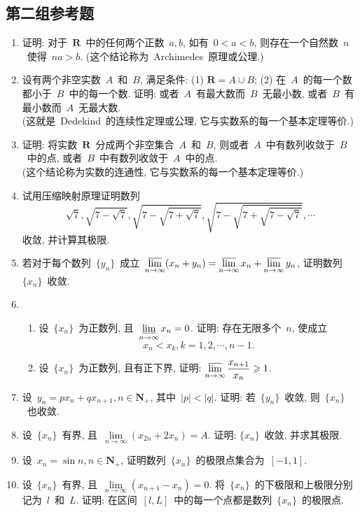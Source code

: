 \documentclass[UTF8,a4paper,11pt,twoside]{book}
\begin{document}
\subsection{第二组参考题}
\begin{enumerate}
	\item 证明: 对于~$\mathbf{R}$~中的任何两个正数~$a,b$, 如有~$0<a<b$, 则存在一个自然数~$n$~使得~$na>b$. (这个结论称为~Archimedes~原理或公理.)

	\item 设有两个非空实数~$A$~和~$B$, 满足条件: (1) $\mathbf{R}=A\cup B$; (2) 在~$A$~的每一个数都小于~$B$~中的每一个数. 证明: 或者~$A$~有最大数而~$B$~无最小数, 或者~$B$~有最小数而~$A$~无最大数.\\
	      (这就是~Dedekind~的连续性定理或公理, 它与实数系的每一个基本定理等价.)

	\item 证明: 将实数~$\mathbf{R}$~分成两个非空集合~$A$~和~$B$, 则或者~$A$~中有数列收敛于~$B$~中的点, 或者~$B$~中有数列收敛于~$A$~中的点.\\
	      (这个结论称为实数的连通性, 它与实数系的每一个基本定理等价.)

	\item 试用压缩映射原理证明数列
	      \[
		      \sqrt{7}, \sqrt{7-\sqrt{7}}, \sqrt{7-\sqrt{7+\sqrt{7}}}, \sqrt{7-\sqrt{7+\sqrt{7-\sqrt{7}}}}, \cdots
	      \]
	      收敛, 并计算其极限.

	\item 若对于每个数列~$\{y_n\}$~成立~$\varlimsup\limits_{n\to\infty}(x_n+y_n)=\varlimsup\limits_{n\to\infty} x_n+\varlimsup\limits_{n\to\infty} y_n$, 证明数列~$\{x_n\}$~收敛.

	\item
	      \begin{enumerate}[(1)]
		      \item 设~$\{x_n\}$~为正数列, 且~$\varliminf\limits_{n\to\infty} x_n=0$. 证明: 存在无限多个~$n$, 使成立
		            \[
			            x_n<x_k, k=1,2,\cdots,n-1.
		            \]
		      \item 设~$\{x_n\}$~为正数列, 且有正下界, 证明: $\varlimsup\limits_{n\to\infty} \dfrac{x_{n+1}}{x_n}\geqslant 1$.
	      \end{enumerate}

	\item 设~$y_n=px_n+qx_{n+1}, n\in\mathbf{N}_{+}$, 其中~$|p|<|q|$. 证明: 若~$\{y_n\}$~收敛, 则~$\{x_n\}$~也收敛.

	\item 设~$\{x_n\}$~有界, 且~$\lim\limits_{n\to\infty} (x_{2n}+2x_n)=A$. 证明: $\{x_n\}$~收敛, 并求其极限.

	\item 设~$x_n=\sin{n}, n\in\mathbf{N}_{+}$, 证明数列~$\{x_n\}$~的极限点集合为~$[-1,1]$.

	\item 设~$\{x_n\}$~有界, 且~$\lim\limits_{n\to\infty} (x_{n+1}-x_n)=0$. 将~$\{x_n\}$~的下极限和上极限分别记为~$l$~和~$L$. 证明: 在区间~$[l,L]$~中的每一个点都是数列~$\{x_n\}$~的极限点.
\end{enumerate}
\end{document}
